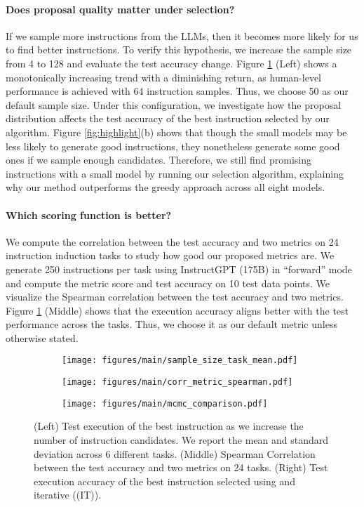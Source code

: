 \paragraph{Does proposal quality matter under selection?} If we sample more instructions from the LLMs, then it becomes more likely for us to find better instructions. To verify this hypothesis, we increase the sample size from 4 to 128 and evaluate the test accuracy change. Figure \ref{fig:mcmc_comparison} (Left) shows a monotonically increasing trend with a diminishing return, as human-level performance is achieved with 64 instruction samples. Thus, we choose 50 as our default sample size. Under this configuration, we investigate how the proposal distribution affects the test accuracy of the best instruction selected by our algorithm. Figure \ref{fig:highlight}(b) shows that though the small models may be less likely to generate good instructions, they nonetheless generate some good ones if we sample enough candidates. Therefore, we still find promising instructions with a small model by running our selection algorithm, explaining why our method outperforms the greedy approach \cite{honovich2022instruction} across all eight models.

\paragraph{Which scoring function is better?} We compute the correlation between the test accuracy and two metrics on 24 instruction induction tasks to study how good our proposed metrics are. We generate 250 instructions per task using InstructGPT (175B) in “forward” mode and compute the metric score and test accuracy on 10 test data points. We visualize the Spearman correlation between the test accuracy and two metrics. Figure \ref{fig:mcmc_comparison} (Middle) shows that the execution accuracy aligns better with the test performance across the tasks. Thus, we choose it as our default metric unless otherwise stated.

\begin{figure}
  \vspace{-0.15in}
  \centering
  \begin{subfigure}[b]{0.31\textwidth}
  \texttt{[image: figures/main/sample\_size\_task\_mean.pdf]}
  \end{subfigure}\hfill
 \begin{subfigure}[b]{0.31\textwidth}
  \texttt{[image: figures/main/corr\_metric\_spearman.pdf]}
  \end{subfigure}\hfill
   \begin{subfigure}[b]{0.31\textwidth}
  \texttt{[image: figures/main/mcmc\_comparison.pdf]}
  \end{subfigure}
  \caption{(Left) Test execution of the best instruction as we increase the number of instruction candidates. We report the mean and standard deviation across 6 different tasks. (Middle) Spearman Correlation between the test accuracy and two metrics on 24 tasks. (Right) Test execution accuracy of the best instruction selected using \algname and iterative \algname (\algname (IT)).}\label{fig:mcmc_comparison}
  \vspace{-0.1in}
\end{figure}

